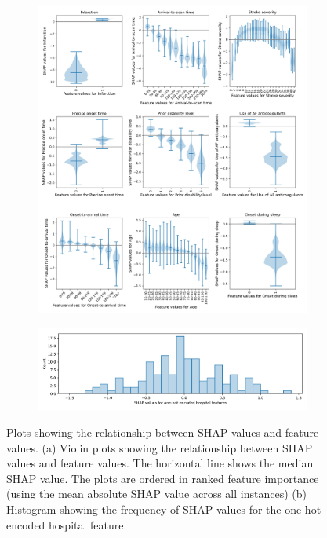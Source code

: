 
\begin{figure}%
\centering
\begin{subfigure}{.9\textwidth}
  \centering
    \includegraphics[width=1.\textwidth]{./images/03a_xgb_10_features_thrombolysis_shap_violin_all_features}
    \caption{}
  \label{fig:shap_feature_subfigure_a}
\end{subfigure}
\begin{subfigure}{.9\textwidth}
  \centering
    \includegraphics[width=1.\textwidth]{./images/03a_xgb_10_features_hosp_shap_hist}
    \caption{}
  \label{fig:shap_feature_subfigure_b}
\end{subfigure}
\caption{Plots showing the relationship between SHAP values and feature values. (a) Violin plots showing the relationship between SHAP values and feature values. The horizontal line shows the median SHAP value. The plots are ordered in ranked feature importance (using the mean absolute SHAP value across all instances) (b) Histogram showing the frequency of SHAP values for the one-hot encoded hospital feature.}
\label{fig:shap_feature_subfigure}
\end{figure}

